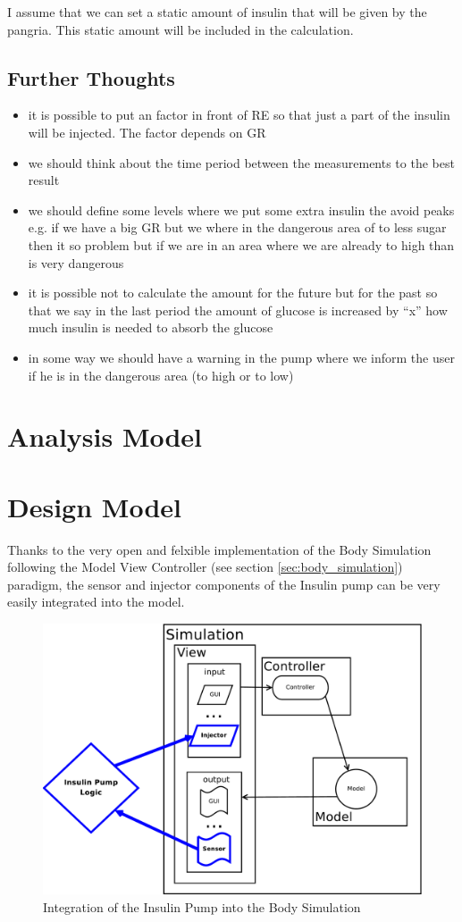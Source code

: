 I assume that we can set a static amount of insulin that will be given by the
pangria. This static amount will be included in the calculation.

\subsection{Further Thoughts}
\begin{itemize}
  \item it is possible to put an factor in front of RE so that just a part of
  the insulin will be injected. The factor depends on GR
  \item we should think about the time period between the measurements to the
  best result
  \item we should define some levels where we put some extra insulin the avoid
  peaks e.g. if we have a big GR but we where in the dangerous area of to less
  sugar then it so problem but if we are in an area where we are already to
  high than is very dangerous
  \item it is possible not to calculate the amount for the future but for the
  past so that we say in the last period the amount of glucose is increased  by
  ``x'' how much insulin is needed to absorb the glucose
  \item in some way we should have a warning in the pump where we inform the
  user if he is in the dangerous area (to high or to low)
\end{itemize}

\section{Analysis Model}

\section{Design Model}
Thanks to the very open and felxible implementation of the Body Simulation
following the Model View Controller (see section \vref{sec:body_simulation})
paradigm, the sensor and injector components of the Insulin pump can be very
easily integrated into the model.

\begin{figure}[htb]
\centering
\includegraphics[scale=0.39]{images/mvc_insulin_pump}
\caption{Integration of the Insulin Pump into the Body Simulation}
\label{fig:mvc_insulin_pump}
\end{figure}
